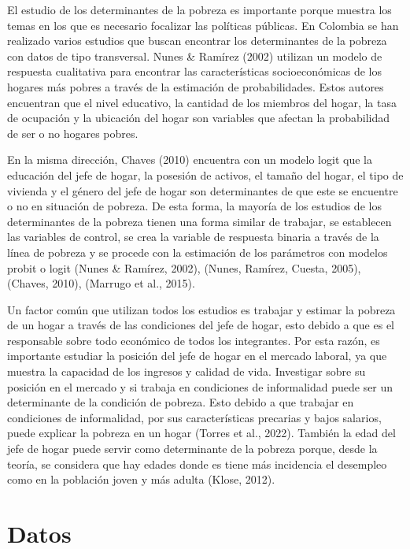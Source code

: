 \documentclass[
]{article}
\begin{document}
El estudio de los determinantes de la pobreza es importante porque
muestra los temas en los que es necesario focalizar las políticas
públicas. En Colombia se han realizado varios estudios que buscan
encontrar los determinantes de la pobreza con datos de tipo transversal.
Nunes \& Ramírez (2002) utilizan un modelo de respuesta cualitativa para
encontrar las características socioeconómicas de los hogares más pobres
a través de la estimación de probabilidades. Estos autores encuentran
que el nivel educativo, la cantidad de los miembros del hogar, la tasa
de ocupación y la ubicación del hogar son variables que afectan la
probabilidad de ser o no hogares pobres.

En la misma dirección, Chaves (2010) encuentra con un modelo logit que
la educación del jefe de hogar, la posesión de activos, el tamaño del
hogar, el tipo de vivienda y el género del jefe de hogar son
determinantes de que este se encuentre o no en situación de pobreza. De
esta forma, la mayoría de los estudios de los determinantes de la
pobreza tienen una forma similar de trabajar, se establecen las
variables de control, se crea la variable de respuesta binaria a través
de la línea de pobreza y se procede con la estimación de los parámetros
con modelos probit o logit (Nunes \& Ramírez, 2002), (Nunes, Ramírez,
Cuesta, 2005), (Chaves, 2010), (Marrugo et al., 2015).

Un factor común que utilizan todos los estudios es trabajar y estimar la
pobreza de un hogar a través de las condiciones del jefe de hogar, esto
debido a que es el responsable sobre todo económico de todos los
integrantes. Por esta razón, es importante estudiar la posición del jefe
de hogar en el mercado laboral, ya que muestra la capacidad de los
ingresos y calidad de vida. Investigar sobre su posición en el mercado y
si trabaja en condiciones de informalidad puede ser un determinante de
la condición de pobreza. Esto debido a que trabajar en condiciones de
informalidad, por sus características precarias y bajos salarios, puede
explicar la pobreza en un hogar (Torres et al., 2022). También la edad
del jefe de hogar puede servir como determinante de la pobreza porque,
desde la teoría, se considera que hay edades donde es tiene más
incidencia el desempleo como en la población joven y más adulta (Klose,
2012).

\hypertarget{datos}{%
\section{Datos}\label{datos}}
\end{document}
